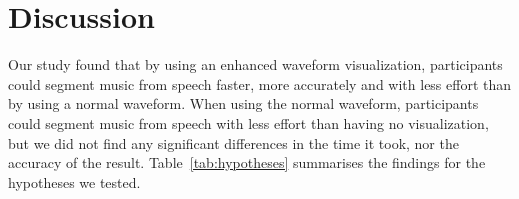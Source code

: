 





\section{Discussion}\label{sec:vis-discuss}

Our study found that by using an enhanced waveform visualization, participants could segment music from speech faster,
more accurately and with less effort than by using a normal waveform.  When using the normal waveform, participants could
segment music from speech with less effort than having no visualization, but we did not find any significant
differences in the time it took, nor the accuracy of the result.  Table~\ref{tab:hypotheses} summarises the findings
for the hypotheses we tested.

